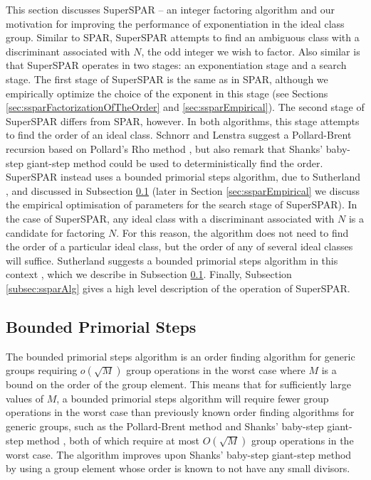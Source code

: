 \documentclass{ucalgthes1}
\theoremstyle{definition}
\begin{document}
This section discusses SuperSPAR -- an integer factoring algorithm and our motivation for improving the performance of exponentiation in the ideal class group.  Similar to SPAR, SuperSPAR attempts to find an ambiguous class with a discriminant associated with $N$, the odd integer we wish to factor.  Also similar is that SuperSPAR operates in two stages: an exponentiation stage and a search stage.  The first stage of SuperSPAR is the same as in SPAR, although we empirically optimize the choice of the exponent in this stage (see Sections \ref{sec:ssparFactorizationOfTheOrder} and \ref{sec:ssparEmpirical}).  The second stage of SuperSPAR differs from SPAR, however.  In both algorithms, this stage attempts to find the order of an ideal class.  Schnorr and Lenstra \mbox{\cite[p.294]{Schnorr1984}} suggest a Pollard-Brent recursion \cite{Brent1980} based on Pollard's Rho method \cite{Pollard1975}, but also remark \cite[p.298]{Schnorr1984} that Shanks' baby-step giant-step method \cite{Shanks1971} could be used to deterministically find the order.  SuperSPAR instead uses a bounded primorial steps algorithm, due to Sutherland \cite[\S 4.1]{Sutherland2007}, and discussed in Subsection \ref{subsec:boundedPrimorialSteps} (later in Section \ref{sec:ssparEmpirical} we discuss the empirical optimisation of parameters for the search stage of SuperSPAR).  In the case of SuperSPAR, any ideal class with a discriminant associated with $N$ is a candidate for factoring $N$.  For this reason, the algorithm does not need to find the order of a particular ideal class, but the order of any of several ideal classes will suffice.  Sutherland suggests a bounded primorial steps algorithm in this context \cite[\S 5.4]{Sutherland2007}, which we describe in Subsection \ref{subsec:boundedPrimorialSteps}.  Finally, Subsection \ref{subsec:ssparAlg} gives a high level description of the operation of SuperSPAR.


\subsection{Bounded Primorial Steps}
\label{subsec:boundedPrimorialSteps}

The bounded primorial steps algorithm \cite{Sutherland2007} is an order finding algorithm for generic groups requiring $o(\sqrt M)$ group operations in the worst case where $M$ is a bound on the order of the group element.  This means that for sufficiently large values of $M$, a bounded primorial steps algorithm will require fewer group operations in the worst case than previously known order finding algorithms for generic groups, such as the Pollard-Brent method \cite{Brent1980} and Shanks' baby-step giant-step method \cite{Shanks1971}, both of which require at most $O(\sqrt M)$ group operations in the worst case.  The algorithm improves upon Shanks' baby-step giant-step method by using a group element whose order is known to not have any small divisors.
\end{document}
